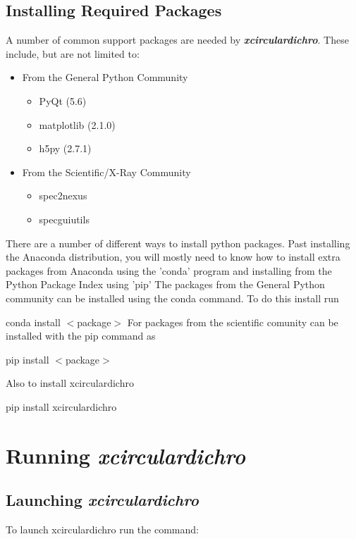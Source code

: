 \documentclass[12pt,letterpaper, openany]{book}
\begin{document}
\section{Installing Required Packages}\label{sec:installingReqPackages}
A number of common support packages are needed by
\textbf{\textit{xcirculardichro}}.  These include, but are not limited to:

\begin{itemize}
\itemsep0em
\item From the General Python Community

\begin{itemize}
\itemsep0em
\item PyQt (5.6)
\item matplotlib (2.1.0)
\item h5py (2.7.1)
\end{itemize}

\item From the Scientific/X-Ray Community

\begin{itemize}
\itemsep0em
\item spec2nexus
\item specguiutils
\end{itemize}

\end{itemize}

\noindent
There are a number of different ways to install python packages.  Past
installing the Anaconda distribution, you will mostly need to know how to
install extra packages from Anaconda using the 'conda' program and installing
from the Python Package Index\cite{PYTHONPACKAGEINDEX} using 'pip'
The packages from the General Python community can be installed using the conda
command.  To do this install run

conda install $<$package$>$
\newline
\noindent
For packages from the scientific comunity can be installed with the pip command
as

pip install $<$package$>$


\noindent
Also to install xcirculardichro

pip install xcirculardichro

\chapter{Running \textbf{\textit{xcirculardichro}}}\label{chap:running}

\section{Launching \textbf{\textit{xcirculardichro}}}\label{sec:launching}
To launch xcirculardichro run the command:
\end{document}
